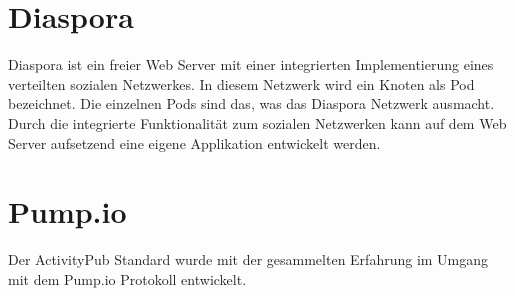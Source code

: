 \section{Diaspora}
\label{sub:diaspora}
Diaspora ist ein freier Web Server mit einer integrierten Implementierung eines verteilten sozialen Netzwerkes. In diesem Netzwerk wird ein Knoten als Pod bezeichnet. Die einzelnen Pods sind das, was das Diaspora Netzwerk ausmacht. Durch die integrierte Funktionalität zum sozialen Netzwerken kann auf dem Web Server aufsetzend eine eigene Applikation entwickelt werden.~\\
\section{Pump.io}
\label{sub:pumpio}
Der ActivityPub Standard wurde mit der gesammelten Erfahrung im Umgang mit dem Pump.io Protokoll entwickelt.\\
